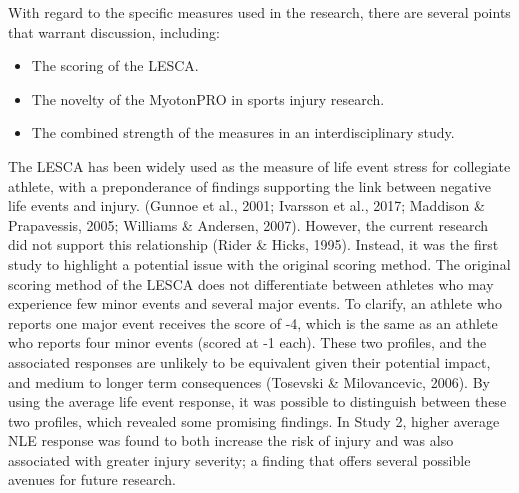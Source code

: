 \documentclass[
  english,
  man,floatsintext]{apa6}
\providecommand{\tightlist}{%
  \setlength{\itemsep}{0pt}\setlength{\parskip}{0pt}}
\begin{document}
With regard to the specific measures used in the research, there are several points that warrant discussion, including:

\begin{itemize}
\tightlist
\item
  The scoring of the LESCA.
\item
  The novelty of the MyotonPRO in sports injury research.
\item
  The combined strength of the measures in an interdisciplinary study.
\end{itemize}

The LESCA has been widely used as the measure of life event stress for collegiate athlete, with a preponderance of findings supporting the link between negative life events and injury.
(Gunnoe et al., 2001; Ivarsson et al., 2017; Maddison \& Prapavessis, 2005; Williams \& Andersen, 2007).
However, the current research did not support this relationship (Rider \& Hicks, 1995).
Instead, it was the first study to highlight a potential issue with the original scoring method.
The original scoring method of the LESCA does not differentiate between athletes who may experience few minor events and several major events. To clarify, an athlete who reports one major event receives the score of -4, which is the same as an athlete who reports four minor events (scored at -1 each). These two profiles, and the associated responses are unlikely to be equivalent given their potential impact, and medium to longer term consequences (Tosevski \& Milovancevic, 2006).
By using the average life event response, it was possible to distinguish between these two profiles, which revealed some promising findings.
In Study 2, higher average NLE response was found to both increase the risk of injury and was also associated with greater injury severity; a finding that offers several possible avenues for future research.
\end{document}
